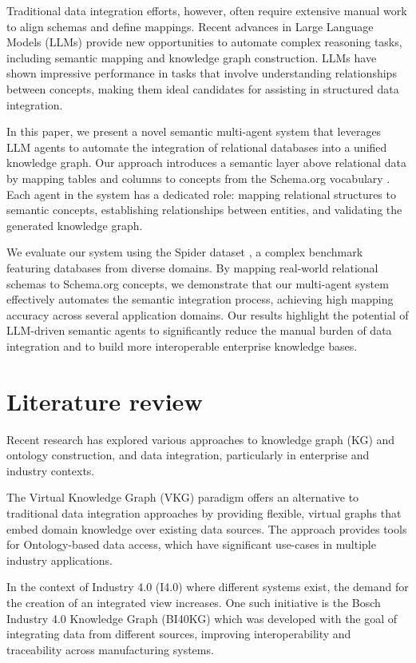 \documentclass[runningheads]{llncs}
\begin{document}
Traditional data integration efforts, however, often require extensive manual work to align schemas and define mappings. Recent advances in Large Language Models (LLMs) \cite{chang2024survey} provide new opportunities to automate complex reasoning tasks, including semantic mapping and knowledge graph construction. LLMs have shown impressive performance in tasks that involve understanding relationships between concepts, making them ideal candidates for assisting in structured data integration.

In this paper, we present a novel semantic multi-agent system that leverages LLM agents to automate the integration of relational databases into a unified knowledge graph. Our approach introduces a semantic layer above relational data by mapping tables and columns to concepts from the Schema.org vocabulary \cite{schemaorg}. Each agent in the system has a dedicated role: mapping relational structures to semantic concepts, establishing relationships between entities, and validating the generated knowledge graph.

We evaluate our system using the Spider dataset \cite{yu2018spider}, a complex benchmark featuring databases from diverse domains. By mapping real-world relational schemas to Schema.org concepts, we demonstrate that our multi-agent system effectively automates the semantic integration process, achieving high mapping accuracy across several application domains. Our results highlight the potential of LLM-driven semantic agents to significantly reduce the manual burden of data integration and to build more interoperable enterprise knowledge bases.

\section{Literature review}
Recent research has explored various approaches to knowledge graph (KG) and ontology construction, and data integration, particularly in enterprise and industry contexts.

The Virtual Knowledge Graph (VKG) paradigm \cite{xiao2019virtual} offers an alternative to traditional data integration approaches by providing flexible, virtual graphs that embed domain knowledge over existing data sources. The approach provides tools for Ontology-based data access, which have significant use-cases in multiple industry applications. 

In the context of Industry 4.0 (I4.0) where different systems exist, the demand for the creation of an integrated view increases. One such initiative is the Bosch Industry 4.0 Knowledge Graph (BI40KG) \cite{grangel2020knowledge} which was developed with the goal of integrating data from different sources, improving interoperability and traceability across manufacturing systems. 
\end{document}
